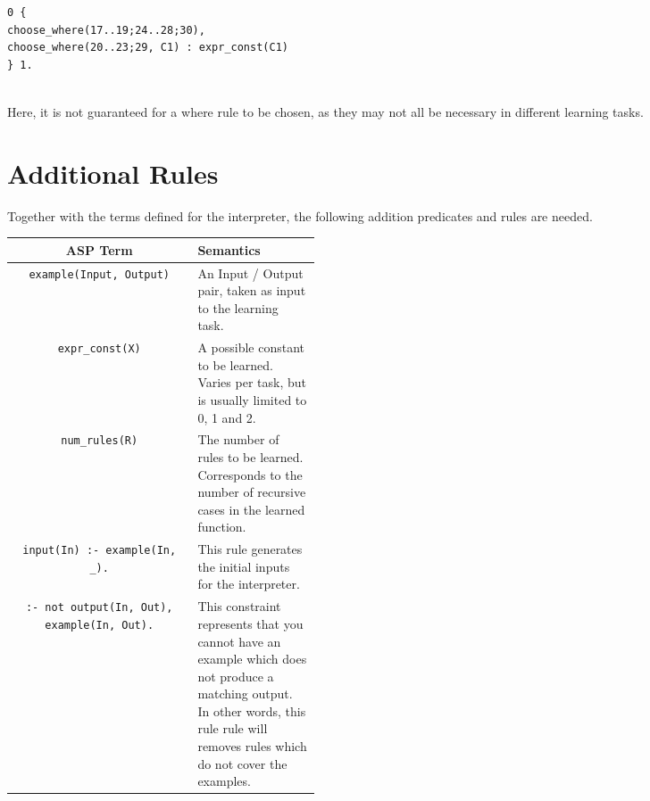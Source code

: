 \begin{lstlisting}
0 {
choose_where(17..19;24..28;30),
choose_where(20..23;29, C1) : expr_const(C1)
} 1.
\end{lstlisting}
\mbox{} \\
Here, it is not guaranteed for a where rule to be chosen, as they may not all be necessary in different learning tasks. 

\section{Additional Rules}
Together with the terms defined for the interpreter, the following addition predicates and rules are needed.
\begin{center}
\begin{tabular}{| c | m{0.4\linewidth} |}
\hline
\textbf{ASP Term} & \textbf{Semantics} \\
\hline
\lstinline!example(Input, Output)!
&
\mbox{}\newline
An Input / Output pair, taken as input to the learning task.\newline
\\
\hline
\lstinline!expr_const(X)!
&
\mbox{}\newline
A possible constant to be learned. Varies per task, but is usually limited to 0, 1 and 2.\newline
\\
\hline
\lstinline!num_rules(R)!
&
\mbox{}\newline
The number of rules to be learned. Corresponds to the number of recursive cases in the learned function.\newline
\\
\hline
\lstinline!input(In) :- example(In, _).!
&
\mbox{}\newline
This rule generates the initial inputs for the interpreter.\newline
\\
\hline
\lstinline!:- not output(In, Out), example(In, Out).!
&
\mbox{}\newline
This constraint represents that you cannot have an example which does not produce a matching output. In other words, this rule rule will removes rules which do not cover the examples. \newline
\\
\hline
\end{tabular}
\end{center}

